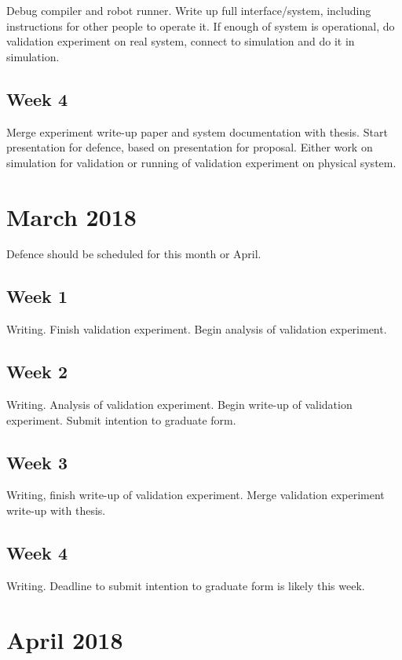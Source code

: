 Debug compiler and robot runner. 
Write up full interface/system, including instructions for other people to operate it. 
If enough of system is operational, do validation experiment on real system, connect to simulation and do it in simulation. 

\subsection{Week 4}

Merge experiment write-up paper and system documentation with thesis.
Start presentation for defence, based on presentation for proposal. 
Either work on simulation for validation or running of validation experiment on physical system. 

\section{March 2018}

Defence should be scheduled for this month or April. 

\subsection{Week 1}

Writing.
Finish validation experiment.
Begin analysis of validation experiment. 

\subsection{Week 2}

Writing.
Analysis of validation experiment. 
Begin write-up of validation experiment. 
Submit intention to graduate form. 

\subsection{Week 3}

Writing, finish write-up of validation experiment. Merge validation experiment write-up with thesis. 

\subsection{Week 4}

Writing. 
Deadline to submit intention to graduate form is likely this week. 

\section{April 2018}

